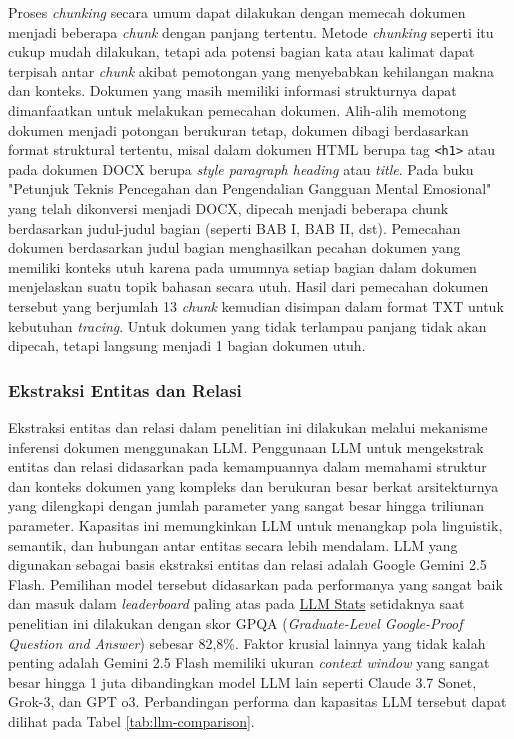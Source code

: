Proses \textit{chunking} secara umum dapat dilakukan dengan memecah dokumen menjadi beberapa \textit{chunk} dengan panjang tertentu.
Metode \textit{chunking} seperti itu cukup mudah dilakukan, tetapi ada potensi bagian kata atau kalimat dapat terpisah antar \textit{chunk} akibat pemotongan yang menyebabkan kehilangan makna dan konteks.
Dokumen yang masih memiliki informasi strukturnya dapat dimanfaatkan untuk melakukan pemecahan dokumen.
Alih-alih memotong dokumen menjadi potongan berukuran tetap, dokumen dibagi berdasarkan format struktural tertentu, misal dalam dokumen HTML berupa tag \texttt{<h1>} atau pada dokumen DOCX berupa \textit{style paragraph heading} atau \textit{title}.
Pada buku "Petunjuk Teknis Pencegahan dan Pengendalian Gangguan Mental Emosional" yang telah dikonversi menjadi DOCX, dipecah menjadi beberapa chunk berdasarkan judul-judul bagian (seperti BAB I, BAB II, dst).
Pemecahan dokumen berdasarkan judul bagian menghasilkan pecahan dokumen yang memiliki konteks utuh karena pada umumnya setiap bagian dalam dokumen menjelaskan suatu topik bahasan secara utuh.
Hasil dari pemecahan dokumen tersebut yang berjumlah 13 \textit{chunk} kemudian disimpan dalam format TXT untuk kebutuhan \textit{tracing}.
Untuk dokumen yang tidak terlampau panjang tidak akan dipecah, tetapi langsung menjadi 1 bagian dokumen utuh.

\subsubsection{Ekstraksi Entitas dan Relasi}
Ekstraksi entitas dan relasi dalam penelitian ini dilakukan melalui mekanisme inferensi dokumen menggunakan LLM.
Penggunaan LLM untuk mengekstrak entitas dan relasi didasarkan pada kemampuannya dalam memahami struktur dan konteks dokumen yang kompleks dan berukuran besar berkat arsitekturnya yang dilengkapi dengan jumlah parameter yang sangat besar hingga triliunan parameter.
Kapasitas ini memungkinkan LLM untuk menangkap pola linguistik, semantik, dan hubungan antar entitas secara lebih mendalam.
LLM yang digunakan sebagai basis ekstraksi entitas dan relasi adalah Google Gemini 2.5 Flash.
Pemilihan model tersebut didasarkan pada performanya yang sangat baik dan masuk dalam \textit{leaderboard} paling atas pada \href{https://llm-stats.com/}{LLM Stats} setidaknya saat penelitian ini dilakukan dengan skor GPQA (\textit{Graduate-Level Google-Proof Question and Answer}) sebesar 82,8\%.
Faktor krusial lainnya yang tidak kalah penting adalah Gemini 2.5 Flash memiliki ukuran \textit{context window} yang sangat besar hingga 1 juta dibandingkan model LLM lain seperti Claude 3.7 Sonet, Grok-3, dan GPT o3.
Perbandingan performa dan kapasitas LLM tersebut dapat dilihat pada Tabel \ref{tab:llm-comparison}.

